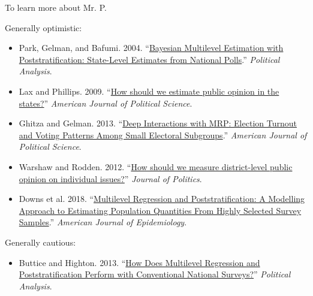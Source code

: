 \documentclass[aspectratio=169]{beamer}
\begin{document}
\begin{frame}{To learn more about Mr. P.}

{\footnotesize
Generally optimistic:
\begin{itemize}
\item Park, Gelman, and Bafumi. 2004. ``\textcolor{blue}{\href{https://www.jstor.org/stable/25791784}{Bayesian Multilevel Estimation with Poststratification: State-Level Estimates from National Polls}}.'' \textit{Political Analysis}.
\item Lax and Phillips. 2009. ``\textcolor{blue}{\href{https://www.jstor.org/stable/25193870}{How should we estimate public opinion in the states?}}'' \textit{American Journal of Political Science}.
\item Ghitza and Gelman. 2013. ``\textcolor{blue}{\href{https://www.jstor.org/stable/23496652}{Deep Interactions with MRP: Election Turnout and Voting Patterns Among Small Electoral Subgroups}}.'' \textit{American Journal of Political Science}.
\item Warshaw and Rodden. 2012. ``\textcolor{blue}{\href{http://www.jstor.org/stable/10.1017/s0022381611001204}{How should we measure district-level public opinion on individual issues?}}'' \textit{Journal of Politics}.
\item Downs et al. 2018. ``\textcolor{blue}{\href{https://doi.org/10.1093/aje/kwy070}{Multilevel Regression and Poststratification: A Modelling Approach to Estimating Population Quantities From Highly Selected Survey Samples}}.'' \textit{American Journal of Epidemiology}.
\end{itemize}
Generally cautious:
\begin{itemize}
\item Buttice and Highton. 2013. ``\textcolor{blue}{\href{http://www.jstor.org/stable/24572674}{How Does Multilevel Regression and Poststratification Perform with Conventional National Surveys?}}'' \textit{Political Analysis}.
\end{itemize}
}

\end{frame}
%
\end{document}
